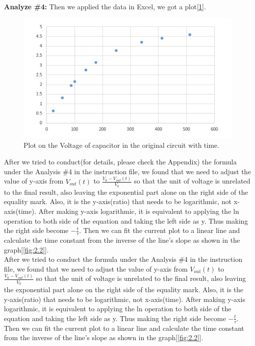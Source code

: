 \textbf{Analyze \#4:} \newline
\phantom{ } Then we applied the data in Excel, we got a plot[\ref{fig:2.1}].\\

\begin{figure}[!htbp]
	\centering %
	\includegraphics[width=\linewidth]{images/2_1.PNG} %
	\caption{Plot on the Voltage of capacitor in the original circuit with time.} %
	\label{fig:2.1} %
\end{figure}

\phantom{ } After we tried to conduct(for details, please check the Appendix) the formula under the Analysis \#4 in the instruction file, we found that we need to adjust the value of y-axis from $V_{out}(t)$ to $\frac{V_0 - V_{out}(t)}{V_0}$ so that the unit of voltage is unrelated to the final result, also leaving the exponential part alone on the right side of the equality mark. Also, it is the y-axis(ratio) that needs to be logarithmic, not x-axis(time). After making y-axis logarithmic, it is equivalent to applying the ln operation to both side of the equation and taking the left side as y. Thus making the right side become $-\frac{t}{\tau}$. Then we can fit the current plot to a linear line and calculate the time constant from the inverse of the line's slope as shown in the graph[\ref{fig:2.2}].\\

\phantom{ }After we tried to conduct the formula under the Analysis \#4 in the instruction file, we found that we need to adjust the value of y-axis from $V_{out}(t)$ to $\frac{V_0 - V_{out}(t)}{V_0}$ so that the unit of voltage is unrelated to the final result, also leaving the exponential part alone on the right side of the equality mark. Also, it is the y-axis(ratio) that needs to be logarithmic, not x-axis(time). After making y-axis logarithmic, it is equivalent to applying the ln operation to both side of the equation and taking the left side as y. Thus making the right side become $-\frac{t}{\tau}$. Then we can fit the current plot to a linear line and calculate the time constant from the inverse of the line's slope as shown in the graph[\ref{fig:2.2}].\\


